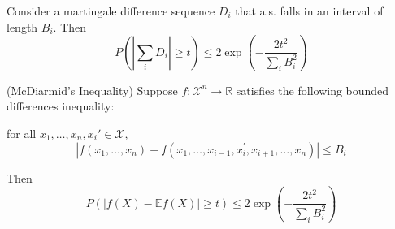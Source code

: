 \begin{lemma} \cite*{Bartlett:2020}
  Consider a martingale difference sequence $D_i$ that a.s. falls in an interval of length $B_i$. Then
  \begin{equation}
    P\left(\left|\sum_{i} D_{i}\right| \geq t\right) \leq 2 \exp \left(-\frac{2 t^{2}}{\sum_{i} B_{i}^{2}}\right)
  \end{equation}
\end{lemma}


\begin{corollary} (McDiarmid's Inequality) \cite*{Sridharan_agentle}
  Suppose $f: \mathcal{X}^n \rightarrow \mathbb{R}$ satisfies the following bounded differences inequality:

  for all $x_1, \dots, x_n , x_{i}' \in \mathcal{X}$,
  \begin{equation}
    \left|f\left(x_{1}, \ldots, x_{n}\right)-f\left(x_{1}, \ldots, x_{i-1}, x_{i}^{\prime}, x_{i+1}, \ldots, x_{n}\right)\right| \leq B_{i}
  \end{equation}

  Then
  \begin{equation}
    P(|f(X)-\mathbb{E} f(X)| \geq t) \leq 2 \exp \left(-\frac{2 t^{2}}{\sum_{i} B_{i}^{2}}\right)
  \end{equation}
\end{corollary}

